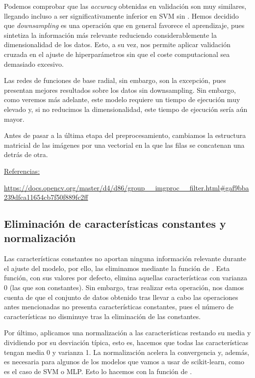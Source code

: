 \documentclass[a4]{article}
\begin{document}
Podemos comprobar que las \textit{accuracy} obtenidas en validación son muy similares, llegando incluso a ser significativamente inferior en SVM sin . Hemos decidido que \textit{downsampling} es una operación que en general favorece el aprendizaje, pues sintetiza la información más relevante reduciendo considerablemente la dimensionalidad de los datos. Esto, a su vez, nos permite aplicar validación cruzada en el ajuste de hiperparámetros sin que el coste computacional sea demasiado excesivo.

Las redes de funciones de base radial, sin embargo, son la excepción, pues presentan mejores resultados sobre los datos sin downsampling. Sin embargo, como veremos más adelante, este modelo requiere un tiempo de ejecución muy elevado y, si no reducimos la dimensionalidad, este tiempo de ejecución sería aún mayor. 


Antes de pasar a la última etapa del preprocesamiento, cambiamos la estructura matricial de las imágenes por una vectorial en la que las filas se concatenan una detrás de otra.

\underline{Referencias:}

\href{https://docs.opencv.org/master/d4/d86/group__imgproc__filter.html#gaf9bba239dfca11654cb7f50f889fc2ff}{https://docs.opencv.org/master/d4/d86/group\_\_imgproc\_\_filter.html\#gaf9bba239dfca11654cb7f50f889fc2ff}

\subsection{Eliminación de características constantes y normalización}

Las características constantes no aportan ninguna información relevante durante el ajuste del modelo, por ello, las eliminamos mediante la función  de . Esta función, con sus valores por defecto, elimina aquellas características con varianza 0 (las que son constantes). Sin embargo, tras realizar esta operación, nos damos cuenta de que el conjunto de datos obtenido tras llevar a cabo las operaciones antes mencionadas no presenta características constantes, pues el número de características no disminuye tras la eliminación de las constantes.

Por último, aplicamos una normalización a las características restando su media y dividiendo por su desviación típica, esto es, hacemos que todas las características tengan media 0 y varianza 1. La normalización acelera la convergencia y, además, es necesaria para algunos de los modelos que vamos a usar de scikit-learn, como es el caso de SVM o MLP. Esto lo hacemos con la función  de .
\end{document}

